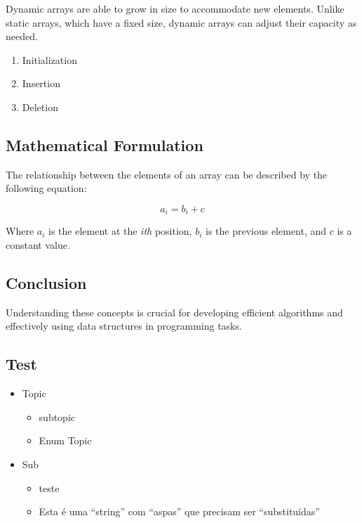 Dynamic arrays are able to grow in size to accommodate new elements. Unlike static arrays, which have a fixed size, dynamic arrays can adjust their capacity as needed.

\begin{enumerate}
	\item Initialization
	\item Insertion
	\item Deletion
\end{enumerate}

\subsection*{Mathematical Formulation}

The relationship between the elements of an array can be described by the following equation:

\[
a_i = b_i + c
\]

Where $a_i$ is the element at the \textit{ith} position, $b_i$ is the previous element, and $c$ is a constant value.

\subsection*{Conclusion}

Understanding these concepts is crucial for developing efficient algorithms and effectively using data structures in programming tasks.

\hrulefill

\subsection*{Test}

\begin{itemize}
	\item Topic
	\begin{itemize}
		\item subtopic
		\item Enum Topic
	\end{itemize}
	\item Sub
	\begin{itemize}
		\item teste
		\item Esta é uma ``string'' com ``aspas'' que precisam ser ``substituídas''
	\end{itemize}

\end{itemize}


